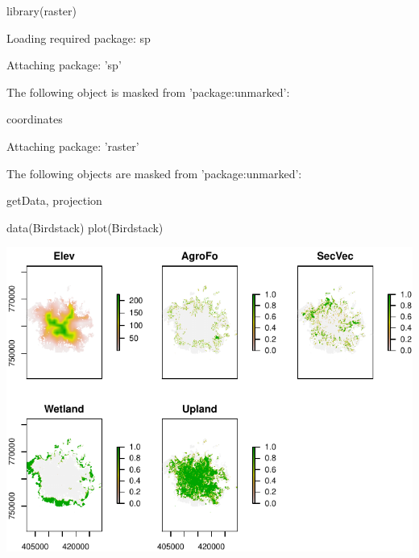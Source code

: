\documentclass[article]{jss}
\begin{document}
\begin{CodeChunk}
\begin{CodeInput}
library(raster)
\end{CodeInput}
\begin{CodeOutput}
Loading required package: sp
\end{CodeOutput}
\begin{CodeOutput}

Attaching package: 'sp'
\end{CodeOutput}
\begin{CodeOutput}
The following object is masked from 'package:unmarked':

    coordinates
\end{CodeOutput}
\begin{CodeOutput}

Attaching package: 'raster'
\end{CodeOutput}
\begin{CodeOutput}
The following objects are masked from 'package:unmarked':

    getData, projection
\end{CodeOutput}
\begin{CodeInput}
data(Birdstack)
plot(Birdstack)
\end{CodeInput}


\begin{center}\includegraphics{diversityocc_files/figure-latex/unnamed-chunk-21-1} \end{center}


\end{CodeChunk}
\end{document}
